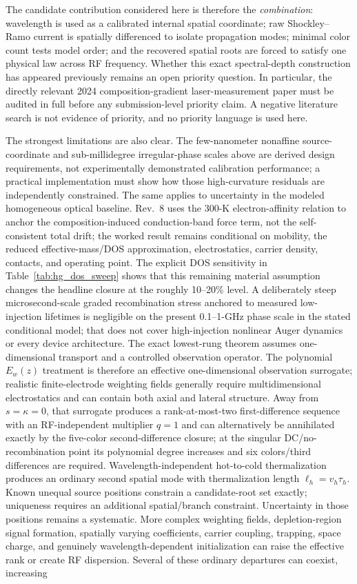 \documentclass[11pt]{article}
\begin{document}
The candidate contribution considered here is therefore the \emph{combination}: wavelength is used as a calibrated internal spatial coordinate; raw Shockley--Ramo current is spatially differenced to isolate propagation modes; minimal color count tests model order; and the recovered spatial roots are forced to satisfy one physical law across RF frequency. Whether this exact spectral-depth construction has appeared previously remains an open priority question. In particular, the directly relevant 2024 composition-gradient laser-measurement paper \cite{Xu2024Laser} must be audited in full before any submission-level priority claim. A negative literature search is not evidence of priority, and no priority language is used here.

The strongest limitations are also clear. The few-nanometer nonaffine source-coordinate and sub-millidegree irregular-phase scales above are derived design requirements, not experimentally demonstrated calibration performance; a practical implementation must show how those high-curvature residuals are independently constrained. The same applies to uncertainty in the modeled homogeneous optical baseline. Rev.~8 uses the 300-K electron-affinity relation \cite{RhigerMustafa2025} to anchor the composition-induced conduction-band force term, not the self-consistent total drift; the worked result remains conditional on mobility, the reduced effective-mass/DOS approximation, electrostatics, carrier density, contacts, and operating point. The explicit DOS sensitivity in Table~\ref{tab:hg_dos_sweep} shows that this remaining material assumption changes the headline closure at the roughly 10--20\% level. A deliberately steep microsecond-scale graded recombination stress anchored to measured low-injection lifetimes \cite{Kopytko2021} is negligible on the present 0.1--1-GHz phase scale in the stated conditional model; that does not cover high-injection nonlinear Auger dynamics or every device architecture. The exact lowest-rung theorem assumes one-dimensional transport and a controlled observation operator. The polynomial $E_w(z)$ treatment is therefore an effective one-dimensional observation surrogate; realistic finite-electrode weighting fields generally require multidimensional electrostatics and can contain both axial and lateral structure. Away from $s=\kappa=0$, that surrogate produces a rank-at-most-two first-difference sequence with an RF-independent multiplier $q=1$ and can alternatively be annihilated exactly by the five-color second-difference closure; at the singular DC/no-recombination point its polynomial degree increases and six colors/third differences are required. Wavelength-independent hot-to-cold thermalization produces an ordinary second spatial mode with thermalization length $\ell_h=v_h\tau_h$. Known unequal source positions constrain a candidate-root set exactly; uniqueness requires an additional spatial/branch constraint. Uncertainty in those positions remains a systematic. More complex weighting fields, depletion-region signal formation, spatially varying coefficients, carrier coupling, trapping, space charge, and genuinely wavelength-dependent initialization can raise the effective rank or create RF dispersion. Several of these ordinary departures can coexist, increasing 
\end{document}
